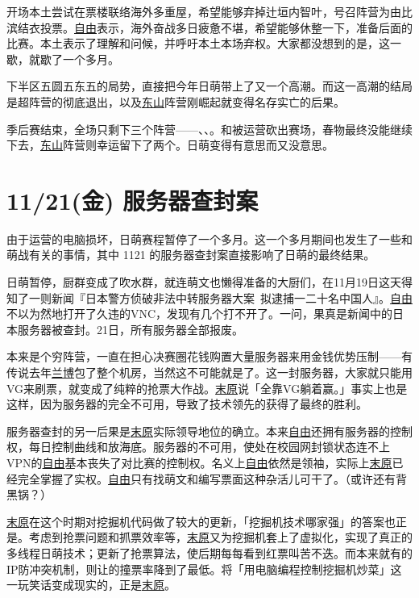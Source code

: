 开场本土尝试在票楼联络海外多重屋，希望能够弃掉辻垣内智叶，号召阵营为由比滨结衣投票。\uline{自由}表示，海外奋战多日疲惫不堪，希望能够休整一下，准备后面的比赛。本土表示了理解和问候，并呼吁本土本场弃权。大家都没想到的是，这一歇，就歇了一个多月。

下半区五圆五东五的局势，直接把今年日萌带上了又一个高潮。而这一高潮的结局是超阵营的彻底退出，以及\uline{东山}阵营刚崛起就变得名存实亡的后果。

季后赛结束，全场只剩下三个阵营——、、。和被运营砍出赛场，春物最终没能继续下去，\uline{东山}阵营则幸运留下了两个。日萌变得有意思而又没意思。

\section{11/21(金) 服务器查封案}

由于运营的电脑损坏，日萌赛程暂停了一个多月。这一个多月期间也发生了一些和萌战有关的事情，其中 1121 的服务器查封案直接影响了日萌的最终结果。

日萌暂停，厨群变成了吹水群，就连萌文也懒得准备的大厨们，在11月19日这天得知了一则新闻『日本警方侦破非法中转服务器大案~拟逮捕一二十名中国人』。\uline{自由}不以为然地打开了久违的VNC，发现有几个打不开了。一问，果真是新闻中的日本服务器被查封。21日，所有服务器全部报废。

本来是个穷阵营，一直在担心决赛圈花钱购置大量服务器来用金钱优势压制——有传说去年\uline{兰博}包了整个机房，当然这不可能就是了。这一封服务器，大家就只能用VG来刷票，就变成了纯粹的抢票大作战。\uline{末原}说「全靠VG躺着赢。」事实上也是这样，因为服务器的完全不可用，导致了技术领先的获得了最终的胜利。

服务器查封的另一后果是\uline{末原}实际领导地位的确立。本来\uline{自由}还拥有服务器的控制权，每日控制曲线和放海底。服务器的不可用，使处在校园网封锁状态连不上VPN的\uline{自由}基本丧失了对比赛的控制权。名义上\uline{自由}依然是领袖，实际上\uline{末原}已经完全掌握了实权。\uline{自由}只有找萌文和编写票面这种杂活儿可干了。（或许还有背黑锅？）

\uline{末原}在这个时期对挖掘机代码做了较大的更新，「挖掘机技术哪家强」的答案也正是。考虑到抢票问题和抓票效率等，\uline{末原}又为挖掘机套上了虚拟化，实现了真正的多线程日萌技术；更新了抢票算法，使后期每每看到红票叫苦不迭。而本来就有的IP防冲突机制，则让的撞票率降到了最低。将「用电脑编程控制挖掘机炒菜」这一玩笑话变成现实的，正是\uline{末原}。


